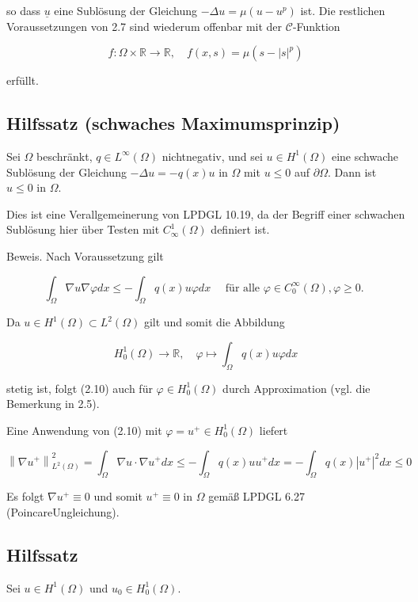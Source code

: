 \documentclass[10pt, letterpaper]{article}
\begin{document}
so dass $\underline{u}$ eine Sublösung der Gleichung $-\Delta u=\mu\left(u-u^{p}\right)$ ist. Die restlichen Voraussetzungen von 2.7 sind wiederum offenbar mit der $\mathcal{C}$-Funktion

$$
f: \Omega \times \mathbb{R} \rightarrow \mathbb{R}, \quad f(x, s)=\mu\left(s-|s|^{p}\right)
$$

erfüllt.

\subsection*{Hilfssatz (schwaches Maximumsprinzip)}

Sei $\Omega$ beschränkt, $q \in L^{\infty}(\Omega)$ nichtnegativ, und sei $u \in H^{1}(\Omega)$ eine schwache Sublösung der Gleichung $-\Delta u=-q(x) u$ in $\Omega$ mit $u \leq 0$ auf $\partial \Omega$. Dann ist $u \leq 0$ in $\Omega$.

Dies ist eine Verallgemeinerung von LPDGL 10.19, da der Begriff einer schwachen Sublösung hier über Testen mit $C_{\infty}^{1}(\Omega)$ definiert ist.

Beweis. Nach Voraussetzung gilt

$$
\int_{\Omega} \nabla u \nabla \varphi d x \leq-\int_{\Omega} q(x) u \varphi d x \quad \text { für alle } \varphi \in C_{0}^{\infty}(\Omega), \varphi \geq 0 \text {. }
$$

Da $u \in H^{1}(\Omega) \subset L^{2}(\Omega)$ gilt und somit die Abbildung

$$
H_{0}^{1}(\Omega) \rightarrow \mathbb{R}, \quad \varphi \mapsto \int_{\Omega} q(x) u \varphi d x
$$

stetig ist, folgt (2.10) auch für $\varphi \in H_{0}^{1}(\Omega)$ durch Approximation (vgl. die Bemerkung in 2.5).

Eine Anwendung von (2.10) mit $\varphi=u^{+} \in H_{0}^{1}(\Omega)$ liefert

$$
\left\|\nabla u^{+}\right\|_{L^{2}(\Omega)}^{2}=\int_{\Omega} \nabla u \cdot \nabla u^{+} d x \leq-\int_{\Omega} q(x) u u^{+} d x=-\int_{\Omega} q(x)\left|u^{+}\right|^{2} d x \leq 0
$$

Es folgt $\nabla u^{+} \equiv 0$ und somit $u^{+} \equiv 0$ in $\Omega$ gemäß LPDGL 6.27 (PoincareUngleichung).

\subsection*{Hilfssatz}

Sei $u \in H^{1}(\Omega)$ und $u_{0} \in H_{0}^{1}(\Omega)$.
\end{document}
